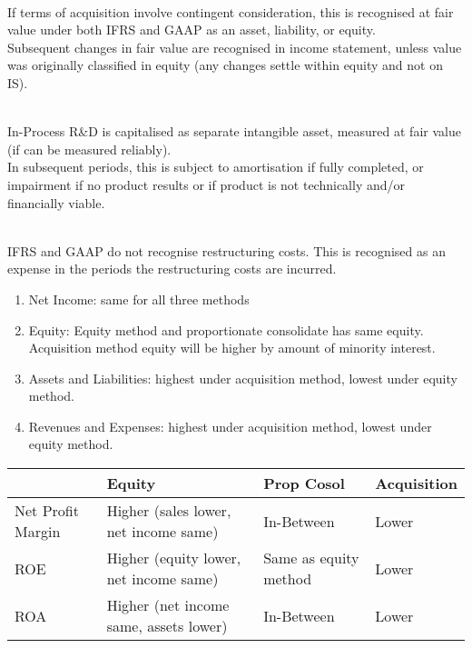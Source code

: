 \begin{remark} \\
If terms of acquisition involve contingent consideration, this is recognised at fair value under both IFRS and GAAP as an asset, liability, or equity.\\
Subsequent changes in fair value are recognised in income statement, unless value was originally classified in equity (any changes settle within equity and not on IS).
\end{remark}

\begin{remark} \\
In-Process R\&D is capitalised as separate intangible asset, measured at fair value (if can be measured reliably).\\
In subsequent periods, this is subject to amortisation if fully completed, or impairment if no product results or if product is not technically and/or financially viable.
\end{remark}

\begin{remark} \\
IFRS and GAAP do not recognise restructuring costs. This is recognised as an expense in the periods the restructuring costs are incurred.
\end{remark}

\begin{remark} 
\begin{enumerate}[label=\roman*.]
\setlength{\itemsep}{0pt}
\item Net Income: same for all three methods
\item Equity: Equity method and proportionate consolidate has same equity. Acquisition method equity will be higher by amount of minority interest.
\item Assets and Liabilities: highest under acquisition method, lowest under equity method.
\item Revenues and Expenses: highest under acquisition method, lowest under equity method.
\end{enumerate}
\end{remark}

\begin{flushleft}
\begin{tabularx}{\textwidth}{p{8em}|p{17.5em}|p{10em}|X}
\hline
\rowcolor{gray!30}
 & Equity & Prop Cosol & Acquisition \\
\hline
Net Profit Margin & Higher (sales lower, net income same) & In-Between & Lower \\
\hline
ROE & Higher (equity lower, net income same) & Same as equity method & Lower \\
\hline
ROA & Higher (net income same, assets lower) & In-Between & Lower \\
\hline
\end{tabularx}
\end{flushleft}
